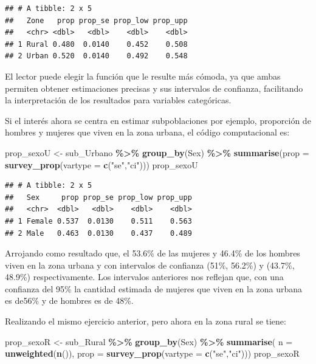 \documentclass[
  spanish,
  12pt,
]{book}
\newenvironment{Shaded}{\begin{snugshade}}{\end{snugshade}}
\newcommand{\AttributeTok}[1]{\textcolor[rgb]{0.13,0.29,0.53}{#1}}
\newcommand{\FunctionTok}[1]{\textcolor[rgb]{0.13,0.29,0.53}{\textbf{#1}}}
\newcommand{\NormalTok}[1]{#1}
\newcommand{\OtherTok}[1]{\textcolor[rgb]{0.56,0.35,0.01}{#1}}
\newcommand{\SpecialCharTok}[1]{\textcolor[rgb]{0.81,0.36,0.00}{\textbf{#1}}}
\newcommand{\StringTok}[1]{\textcolor[rgb]{0.31,0.60,0.02}{#1}}
\begin{document}
\begin{verbatim}
## # A tibble: 2 x 5
##   Zone   prop prop_se prop_low prop_upp
##   <chr> <dbl>   <dbl>    <dbl>    <dbl>
## 1 Rural 0.480  0.0140    0.452    0.508
## 2 Urban 0.520  0.0140    0.492    0.548
\end{verbatim}

El lector puede elegir la función que le resulte más cómoda, ya que ambas permiten obtener estimaciones precisas y sus intervalos de confianza, facilitando la interpretación de los resultados para variables categóricas.

Si el interés ahora se centra en estimar subpoblaciones por ejemplo, proporción de hombres y mujeres que viven en la zona urbana, el código computacional es:

\begin{Shaded}
\begin{Highlighting}[]
\NormalTok{prop\_sexoU }\OtherTok{\textless{}{-}}\NormalTok{ sub\_Urbano }\SpecialCharTok{\%\textgreater{}\%} \FunctionTok{group\_by}\NormalTok{(Sex) }\SpecialCharTok{\%\textgreater{}\%} 
              \FunctionTok{summarise}\NormalTok{(}\AttributeTok{prop =} \FunctionTok{survey\_prop}\NormalTok{(}\AttributeTok{vartype =} \FunctionTok{c}\NormalTok{(}\StringTok{"se"}\NormalTok{,}\StringTok{"ci"}\NormalTok{)))}
\NormalTok{prop\_sexoU}
\end{Highlighting}
\end{Shaded}

\begin{verbatim}
## # A tibble: 2 x 5
##   Sex     prop prop_se prop_low prop_upp
##   <chr>  <dbl>   <dbl>    <dbl>    <dbl>
## 1 Female 0.537  0.0130    0.511    0.563
## 2 Male   0.463  0.0130    0.437    0.489
\end{verbatim}

Arrojando como resultado que, el 53.6\% de las mujeres y 46.4\% de los hombres viven en la zona urbana y con intervalos de confianza (51\%, 56.2\%) y (43.7\%, 48.9\%) respectivamente. Los intervalos anteriores nos reflejan que, con una confianza del 95\% la cantidad estimada de mujeres que viven en la zona urbana es de56\% y de hombres es de 48\%.

Realizando el mismo ejercicio anterior, pero ahora en la zona rural se tiene:

\begin{Shaded}
\begin{Highlighting}[]
\NormalTok{prop\_sexoR }\OtherTok{\textless{}{-}}\NormalTok{ sub\_Rural }\SpecialCharTok{\%\textgreater{}\%} \FunctionTok{group\_by}\NormalTok{(Sex) }\SpecialCharTok{\%\textgreater{}\%} 
              \FunctionTok{summarise}\NormalTok{( }\AttributeTok{n =} \FunctionTok{unweighted}\NormalTok{(}\FunctionTok{n}\NormalTok{()),}
                         \AttributeTok{prop =} \FunctionTok{survey\_prop}\NormalTok{(}\AttributeTok{vartype =} \FunctionTok{c}\NormalTok{(}\StringTok{"se"}\NormalTok{,}\StringTok{"ci"}\NormalTok{)))}
\NormalTok{prop\_sexoR}
\end{Highlighting}
\end{Shaded}
\end{document}
